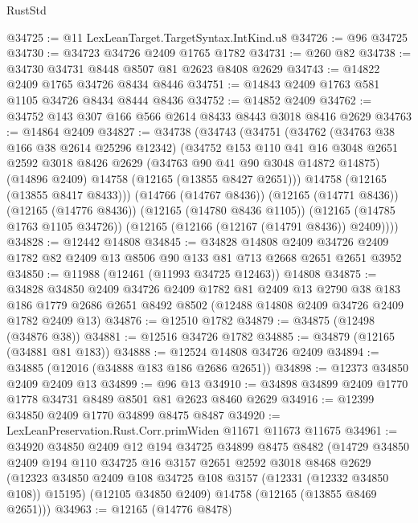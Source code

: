 \begin{lexlean}{RustStd}
\begin{coremodule}
@34725 := @11 LexLeanTarget.TargetSyntax.IntKind.u8
@34726 := @96 @34725
@34730 := @34723 @34726 @2409 @1765 @1782
@34731 := @260 @82
@34738 := @34730 @34731 @8448 @8507 @81 @2623 @8408 @2629
@34743 := @14822 @2409 @1765 @34726 @8434 @8446
@34751 := @14843 @2409 @1763 @581 @1105 @34726 @8434 @8444 @8436
@34752 := @14852 @2409
@34762 := @34752 @143 @307 @166 @566 @2614 @8433 @8443 @3018 @8416 @2629
@34763 := @14864 @2409
@34827 := @34738
    (@34743
      (@34751
        (@34762
          (@34763 @38 @166 @38 @2614 @25296 @12342)
          (@34752
            @153
            @110
            @41
            @16
            @3048
            @2651
            @2592
            @3018
            @8426
            @2629
            (@34763 @90 @41 @90 @3048 @14872 @14875)
            (@14896 @2409)
            @14758
            (@12165 (@13855 @8427 @2651)))
          @14758
          (@12165 (@13855 @8417 @8433)))
        (@14766 (@14767 @8436))
        (@12165 (@14771 @8436))
        (@12165 (@14776 @8436))
        (@12165 (@14780 @8436 @1105))
        (@12165 (@14785 @1763 @1105 @34726))
        (@12165 (@12166 (@12167 (@14791 @8436)) @2409))))
@34828 := @12442 @14808
@34845 := @34828
    @14808
    @2409
    @34726
    @2409
    @1782
    @82
    @2409
    @13
    @8506
    @90
    @133
    @81
    @713
    @2668
    @2651
    @2651
    @3952
@34850 := @11988 (@12461 (@11993 @34725 @12463)) @14808
@34875 := @34828
    @34850
    @2409
    @34726
    @2409
    @1782
    @81
    @2409
    @13
    @2790
    @38
    @183
    @186
    @1779
    @2686
    @2651
    @8492
    @8502
    (@12488 @14808 @2409 @34726 @2409 @1782 @2409 @13)
@34876 := @12510 @1782
@34879 := @34875 (@12498 (@34876 @38))
@34881 := @12516 @34726 @1782
@34885 := @34879 (@12165 (@34881 @81 @183))
@34888 := @12524 @14808 @34726 @2409
@34894 := @34885 (@12016 (@34888 @183 @186 @2686 @2651))
@34898 := @12373 @34850 @2409 @2409 @13
@34899 := @96 @13
@34910 := @34898 @34899 @2409 @1770 @1778 @34731 @8489 @8501 @81 @2623 @8460 @2629
@34916 := @12399 @34850 @2409 @1770 @34899 @8475 @8487
@34920 := LexLeanPreservation.Rust.Corr.primWiden @11671 @11673 @11675
@34961 := @34920
    @34850
    @2409
    @12
    @194
    @34725
    @34899
    @8475
    @8482
    (@14729
      @34850
      @2409
      @194
      @110
      @34725
      @16
      @3157
      @2651
      @2592
      @3018
      @8468
      @2629
      (@12323 @34850 @2409 @108 @34725 @108 @3157 (@12331 (@12332 @34850 @108)) @15195)
      (@12105 @34850 @2409)
      @14758
      (@12165 (@13855 @8469 @2651)))
@34963 := @12165 (@14776 @8478)

\end{coremodule}
\end{lexlean}
